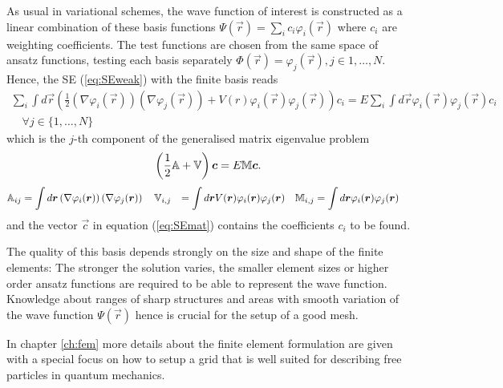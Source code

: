 {As usual in variational schemes, the wave function of interest is constructed as a linear combination of these basis functions $\Psi(\vec{r})=\sum_i c_i \varphi_i(\vec{r})$ where $c_i$ are weighting coefficients.
The test functions are chosen from the same space of ansatz functions, testing each basis separately $\Phi(\vec{r})=\varphi_j(\vec{r}), j\in {1,\hdots, N}$.
Hence, the SE (\ref{eq:SEweak}) with the finite basis reads
\begin{multline}
     \sum_i \int d  \vec{r} \left(\frac 12 \left(\nabla\varphi_i(\vec{r})\right) \left(\nabla\varphi_j(\vec{r})\right) +
                             V(r) \varphi_i(\vec{r}) \varphi_j(\vec{r}) \right) c_i =
               E \sum_i \int d \vec{r} \varphi_i(\vec{r}) \varphi_j(\vec{r}) c_i \\
                      \quad \forall j \in \{1,\hdots ,N\}
\end{multline}
which is the $j$-th component of the generalised matrix eigenvalue problem
\begin{equation}\label{eq:SEmat}
\left(\frac 12 \mathbb{A} +\mathbb{V}\right)\bm{c} =E\mathbb{M}\bm{c}. 
\end{equation}
\begin{align} \label{eq:FEMmatrix}
      \mathbb{A}_{ij} &=\int d \bm{r} \left(\nabla\varphi_i(\bm{r})\right) \left(\nabla\varphi_j(\bm{r})\right) \quad
      \mathbb{V}_{i,j}&=\int d \bm{r} V(\bm{r}) \varphi_i(\bm{r}) \varphi_j(\bm{r}) \quad
      \mathbb{M}_{i,j}&=\int d \bm{r} \varphi_i(\bm{r}) \varphi_j(\bm{r})
\end{align}
and the vector $\vec{c}$ in equation (\ref{eq:SEmat}) contains the coefficients $c_i$ to be found.

The quality of this basis depends strongly on the size and shape of the finite elements:
The stronger the solution varies, the smaller element sizes or higher order ansatz functions are required to be able to represent the wave function.
Knowledge about ranges of sharp structures and areas with smooth variation of the wave function $\Psi(\vec{r})$ hence is crucial for the setup of a good mesh.

In chapter \ref{ch:fem} more details about the finite element formulation are given with a special focus on how to setup a grid that is well suited for describing free particles in quantum mechanics.

}
